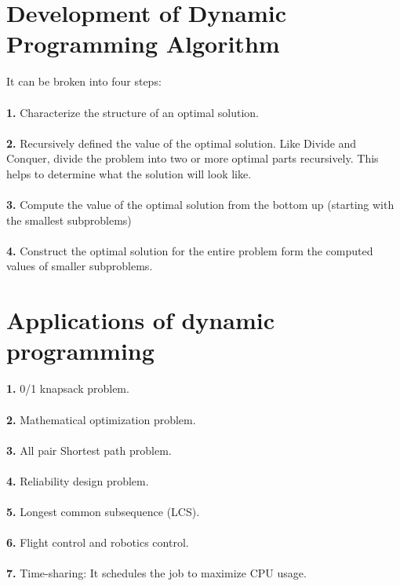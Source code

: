 \documentclass[11pt]{article}
\begin{document}
\section*{Development of Dynamic Programming Algorithm}
It can be broken into four steps:\\\\
\textbf{1.} Characterize the structure of an optimal solution.\\\\
\textbf{2.} Recursively defined the value of the optimal solution. Like Divide and Conquer, divide the problem into two or more optimal parts recursively. This helps to determine what the solution will look like.\\\\
\textbf{3.} Compute the value of the optimal solution from the bottom up (starting with the smallest subproblems)\\\\
\textbf{4.} Construct the optimal solution for the entire problem form the computed values of smaller subproblems.\\ 

\section*{Applications of dynamic programming\\}

\textbf{1.} 0/1 knapsack problem.\\\\
\textbf{2.} Mathematical optimization problem.\\\\
\textbf{3.} All pair Shortest path problem.\\\\
\textbf{4.} Reliability design problem.\\\\
\textbf{5.} Longest common subsequence (LCS).\\\\
\textbf{6.} Flight control and robotics control.\\\\
\textbf{7.} Time-sharing: It schedules the job to maximize CPU usage.\\\\
\end{document}

